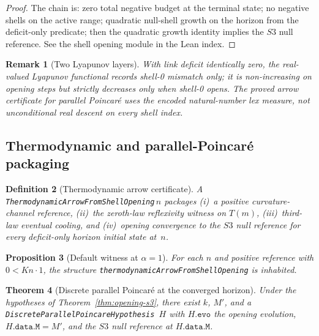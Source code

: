 \documentclass[11pt]{amsart}
\newtheorem{theorem}{Theorem}[section]
\newtheorem{proposition}[theorem]{Proposition}
\newtheorem{definition}[theorem]{Definition}
\newtheorem{remark}[theorem]{Remark}
\begin{document}
\begin{proof}
The chain is: zero total negative budget at the terminal state; no negative shells
on the active range; quadratic null-shell growth on the horizon from the deficit-only
predicate; then the quadratic growth identity implies the $S3$ null reference.
See the shell opening module in the Lean index.
\end{proof}

\begin{remark}[Two Lyapunov layers]
\label{rem:two-lyapunov}
With link deficit identically zero, the real-valued Lyapunov functional records
shell-0 mismatch only; it is non-increasing on opening steps but strictly decreases
only when shell-0 opens. The proved arrow certificate for parallel Poincar\'e uses
the encoded natural-number lex measure, not unconditional real descent on every
shell index.
\end{remark}

\subsection{Thermodynamic and parallel-Poincar\'e packaging}
\label{sec:opening-package}

\begin{definition}[Thermodynamic arrow certificate]
\label{def:thermo-arrow}
A \texttt{ThermodynamicArrowFromShellOpening}\,$n$ packages (i)~a positive
curvature-channel reference, (ii)~the zeroth-law reflexivity witness on $T(m)$,
(iii)~third-law eventual cooling, and (iv)~opening convergence to the $S3$ null
reference for every deficit-only horizon initial state at~$n$.
\end{definition}

\begin{proposition}[Default witness at $\alpha=1$]
\label{prop:thermo-arrow-witness}
For each $n$ and positive reference with $0 < K n \cdot 1$, the structure
\texttt{thermodynamicArrowFromShellOpening} is inhabited.
\end{proposition}

\begin{theorem}[Discrete parallel Poincar\'e at the converged horizon]
\label{thm:opening-pp}
Under the hypotheses of Theorem~\ref{thm:opening-s3}, there exist $k$, $M'$, and a
\texttt{DiscreteParallelPoincareHypothesis}~$H$ with $H.\texttt{evo}$ the opening
evolution, $H.\texttt{data.M}=M'$, and the $S3$ null reference at $H.\texttt{data.M}$.
\end{theorem}
\end{document}
